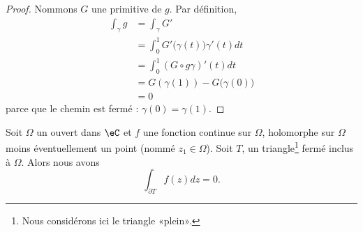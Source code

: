 \begin{proof}
    Nommons \( G\) une primitive de \( g\). Par définition,
    \begin{subequations}
        \begin{align}
            \int_{\gamma}g&=\int_{\gamma}G'\\
            &=\int_0^1G'\big( \gamma(t) \big)\gamma'(t)dt\\
            &=\int_0^1 (G\circ g\gamma)'(t)dt\\
            &=G(\gamma(1))-G\big( \gamma(0) \big)\\
            &=0
        \end{align}
    \end{subequations}
    parce que le chemin est fermé : \( \gamma(0)=\gamma(1)\).
\end{proof}

\begin{lemma}  \label{LemwbwbUR}
    Soit \( \Omega\) un ouvert dans \( \eC\) et \( f\) une fonction continue sur \( \Omega\), holomorphe sur \( \Omega\) moins éventuellement un point (nommé \( z_1\in\Omega\)). Soit \( T\), un triangle\footnote{Nous considérons ici le triangle «plein».} fermé inclus à \( \Omega\). Alors nous avons
    \begin{equation}
        \int_{\partial T}f(z)dz=0.
    \end{equation}
\end{lemma}

